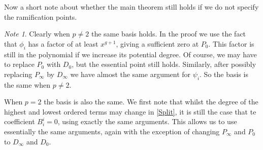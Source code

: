 \documentclass[draft, 11pt]{article} %
\theoremstyle{plain}
\theoremstyle{remark}
\newtheorem*{note}{Note}
\begin{document}
Now a short note about whether the main theorem still holds if we do not specify the ramification points.
\begin{note}
Clearly when $p\neq 2$ the same basis holds. In the proof we use the fact that $\phi_i$ has a factor of at least $x^{g+1}$, giving a sufficient zero at $P_0$.
This factor is still in the polynomial if we increase its potential degree.
Of course, we may have to replace $P_0$ with $D_0$, but the essential point still holds.
Similarly, after possibly replacing $P_\infty$ by $D_\infty$ we have almost the same argument for $\psi_i$.
So the basis is the same when $p\neq2$.

When $p=2$ the basis is also the same.
We first note that whilst the degree of the highest and lowest ordered terms may change in \eqref{Split}, it is still the case that te coefficient $B_i^i =0$, using exactly the same arguments.
This allows us to use essentially the same arguments, again with the exception of changing $P_\infty$ and $P_0$ to $D_\infty$ and $D_0$.
\end{note}




\end{document}
